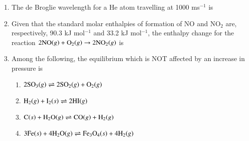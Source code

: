 \documentclass[journal,12pt,onecolumn]{IEEEtran}
\theoremstyle{remark}
\begin{document}
\begin{enumerate}[resume]
\item The de Broglie wavelength for a He atom travelling at 1000 ms$^{-1}$  is
    \begin{enumerate}
  
        \hfill{}
    \end{enumerate}



\item Given that the standard molar enthalpies of formation of NO and NO$_2$ are, respectively, 90.3 kJ mol$^{-1}$ and 33.2 kJ mol$^{-1}$, the enthalpy change 
 for the reaction $2\text{NO\ensuremath{\left(g\right)}} + \text{O}_2\text{\ensuremath{\left(g\right)}} \rightarrow 2\text{NO}_2\text{\ensuremath{\left(g\right)}}$ is
    \begin{enumerate}
        \hfill{}
    \end{enumerate}



\item Among the following, the equilibrium which is NOT affected by an increase in pressure is
    
 \begin{enumerate}
        \item $2\text{SO}_3\text{\ensuremath{\left(g\right)}} \rightleftharpoons 2\text{SO}_2\text{\ensuremath{\left(g\right)}} + \text{O}_2\text{\ensuremath{\left(g\right)}}$
        \item $\text{H}_2\text{\ensuremath{\left(g\right)}} + \text{I}_2\text{\ensuremath{\left(s\right)}} \rightleftharpoons 2\text{HI\ensuremath{\left(g\right)}}$
        \item $\text{C\ensuremath{\left(s\right)}} + \text{H}_2\text{O\ensuremath{\left(g\right)}} \rightleftharpoons \text{CO\ensuremath{\left(g\right)}} + \text{H}_2\text{\ensuremath{\left(g\right)}}$
        \item $3\text{Fe\ensuremath{\left(s\right)}} + 4\text{H}_2\text{O\ensuremath{\left(g\right)}} \rightleftharpoons \text{Fe}_3\text{O}_4\text{\ensuremath{\left(s\right)}} + 4\text{H}_2\text{\ensuremath{\left(g\right)}}$
        \hfill{}
    \end{enumerate}




\end{enumerate}
\end{document}
